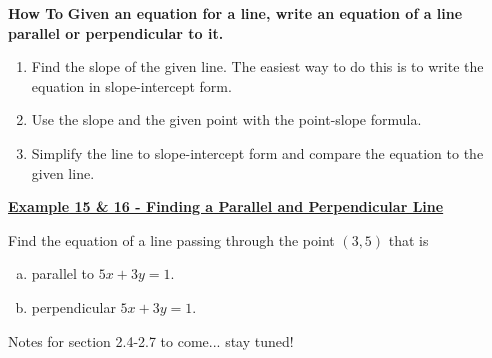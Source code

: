 \documentclass[12pt]{book}
\begin{document}
\newpage

\begin{boxR}
    \textbf{How To}
    \vspace{1mm}
    \hline
      \vspace{2mm}
      \textbf{Given an equation for a line, write an equation of a line parallel or perpendicular to it.}
     \begin{enumerate}
         \item  Find the slope of the given line. The easiest way to do this is to write the equation in slope-intercept form.
         \item Use the slope and the given point with the point-slope formula.
         \item Simplify the line to slope-intercept form and compare the equation to the given line.
         \end{enumerate}
\end{boxR}
\vspace{2mm}

\underline{\textbf{Example 15 \& 16 - Finding a Parallel and Perpendicular Line}}

Find the equation of a line passing through the point  $(3,5)$ that is 
\begin{enumerate}[(a)]
    \item parallel to $5x+3y=1$.
    \item perpendicular $5x+3y=1$.
\end{enumerate}



\vspace{145mm}
Notes for section 2.4-2.7 to come... stay tuned!
\end{document}
